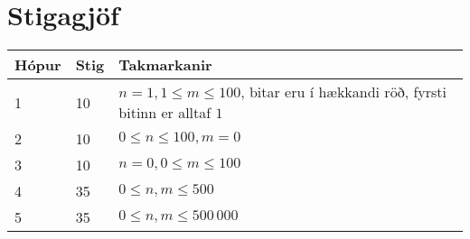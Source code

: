 \section*{Stigagjöf}
\begin{tabular}{|l|l|l|}
\hline
Hópur & Stig & Takmarkanir \\ \hline
1     & 10   & $n = 1, 1 \leq m \leq 100$, bitar eru í hækkandi röð, fyrsti bitinn er alltaf $1$ \\ \hline
2     & 10   & $0 \leq n \leq 100, m = 0$ \\ \hline
3     & 10   & $n = 0, 0 \leq m \leq 100$ \\ \hline
4     & 35   & $0 \leq n, m \leq 500$\\ \hline
5     & 35   & $0 \leq n, m \leq 500\,000$ \\ \hline
\end{tabular}

